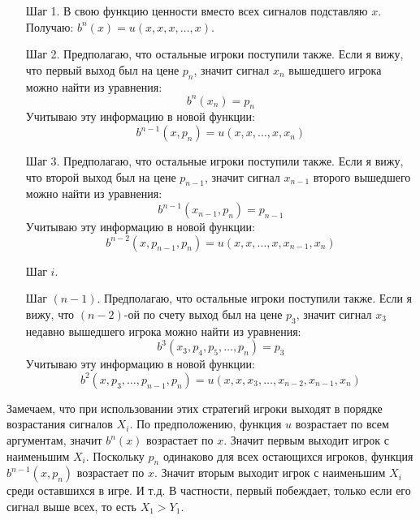 \begin{itemize}
\begin{enumerate}
\item[Шаг 1.] В свою функцию ценности вместо всех сигналов подставляю $ x $. Получаю: $b^{n}(x)=u(x,x,x,\ldots,x)$.
\item[Шаг 2.] Предполагаю, что остальные игроки поступили также. Если я вижу, что первый выход был на цене $ p_{n} $, значит сигнал $x_{n}  $ вышедшего игрока можно найти из уравнения:
\begin{equation}
b^{n}(x_{n})=p_{n}
\end{equation}
Учитываю эту информацию в новой функции:
\begin{equation}
b^{n-1}(x,p_{n})=u(x,x,\ldots,x,x_{n})
\end{equation}
\item[Шаг 3.] Предполагаю, что остальные игроки поступили также. Если я вижу, что второй выход был на цене $ p_{n-1} $, значит сигнал $ x_{n-1} $ второго вышедшего можно найти из уравнения:
\begin{equation}
b^{n-1}(x_{n-1},p_{n})=p_{n-1}
\end{equation}
Учитываю эту информацию в новой функции:
\begin{equation}
b^{n-2}(x,p_{n-1},p_{n})=u(x,x,\ldots,x,x_{n-1},x_{n})
\end{equation}
\item[Шаг $ i $.]

\item[Шаг $ (n-1) $.] Предполагаю, что остальные игроки поступили также. Если я вижу, что $ (n-2) $-ой по счету выход был на цене $ p_{3} $, значит сигнал $ x_{3} $ недавно вышедшего игрока можно найти из уравнения:
\begin{equation}
b^{3}(x_{3},p_{4},p_{5},\ldots,p_{n})=p_{3}
\end{equation}
Учитываю эту информацию в новой функции:
\begin{equation}
b^{2}(x,p_{3},\ldots,p_{n-1},p_{n})=u(x,x,x_{3},\ldots,x_{n-2},x_{n-1},x_{n})
\end{equation}

\end{enumerate}

Замечаем, что при использовании этих стратегий игроки выходят в порядке возрастания сигналов $ X_{i} $. По предположению, функция $ u $ возрастает по всем аргументам, значит $ b^{n}(x) $ возрастает по $ x $. Значит первым выходит игрок с наименьшим $ X_{i} $. Поскольку $ p_{n} $ одинаково для всех остающихся игроков, функция $ b^{n-1}(x,p_{n}) $ возрастает по $ x $. Значит вторым выходит игрок с наименьшим $ X_{i} $ среди оставшихся в игре. И т.д. В частности, первый побеждает, только если его сигнал выше всех, то есть $ X_{1}>Y_{1} $.


\end{itemize}
